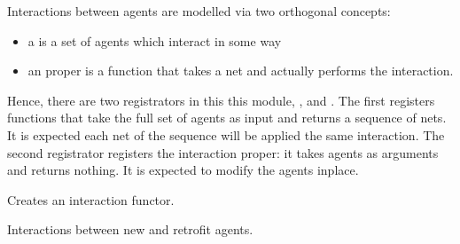 \documentclass[letterpaper,10pt,english]{sphinxmanual}
\begin{document}
Interactions between agents are modelled via two orthogonal concepts:
\begin{itemize}
\item {} 
a  is a set of agents which interact in some way

\item {} 
an  proper is a function that takes a net and actually performs the
interaction.

\end{itemize}

Hence, there are two registrators in this this module,
, and . The
first registers functions that take the full set of agents as input and returns a
sequence of nets. It is expected each net of the sequence will be applied the same
interaction. The second registrator registers the interaction proper: it takes agents as
arguments and returns nothing. It is expected to modify the agents in\sphinxhyphen{}place.

\begin{fulllineitems}
\label{\detokenize{api:muse.interactions.factory}}
Creates an interaction functor.

\end{fulllineitems}


\begin{fulllineitems}
\label{\detokenize{api:muse.interactions.new_to_retro_net}}
Interactions between new and retrofit agents.

\end{fulllineitems}
\end{document}
